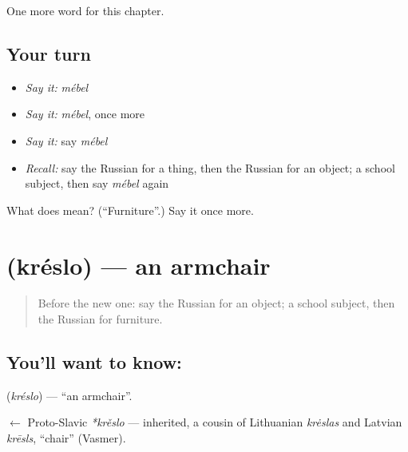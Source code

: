 \begin{grammarlens}[title={What you've built}]
One more word for this chapter.
\end{grammarlens}

\subsection*{Your turn}
\begin{itemize}
\raggedright
  \item \emph{Say it:} \emph{mébel}
  \item \emph{Say it:} \emph{mébel}, once more
  \item \emph{Say it:} say \emph{mébel}
  \item \emph{Recall:} say the Russian for a thing, then the Russian for an object; a school subject, then say \emph{mébel} again
\end{itemize}

\begin{tcolorbox}[breakable,colback=teal!4,colframe=teal!35!black,title={Before you move on}]
What does  mean? (\textquotedblleft{}Furniture\textquotedblright{}.) Say it once more.
\end{tcolorbox}
\section[\texorpdfstring{\ru{кресло} (kréslo)}{кресло (kréslo)}]{ (kréslo) — an armchair}

\label{lesson:RU-C159-kreslo}



\begin{quote}
Before the new one: say the Russian for an object; a school subject, then the Russian for furniture.
\end{quote}

\subsection*{You'll want to know: }
\textbf{} (\emph{kréslo}) — \textquotedblleft{}an armchair\textquotedblright{}.

\begin{cousinweb}
\textbf{} $\leftarrow$ Proto-Slavic \emph{*krěslo} — inherited, a cousin of Lithuanian \emph{krėslas} and Latvian \emph{krēsls}, \textquotedblleft{}chair\textquotedblright{} (Vasmer).
\end{cousinweb}

